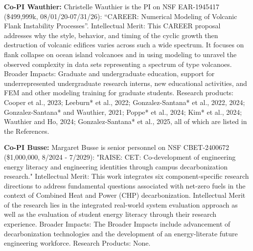 \documentclass[11pt]{article}
\begin{document}
\noindent\textbf{Co-PI Wauthier:}
Christelle Wauthier is the PI on NSF EAR-1945417 (\$499,999k, 08/01/20-07/31/26): “CAREER: Numerical Modeling of Volcanic Flank Instability Processes”. Intellectual Merit: This CAREER proposal addresses why the style, behavior, and timing of the cyclic growth then destruction of volcanic edifices varies across such a wide spectrum. It focuses on flank collapse on ocean island volcanoes and in using modeling to unravel the observed complexity in data sets representing a spectrum of type volcanoes. Broader Impacts: Graduate and undergraduate education, support for underrepresented undergraduate research interns, new educational activities, and FEM and other modeling training for graduate students. Research products: Cooper et al., 2023; Leeburn* et al., 2022; Gonzalez-Santana* et al., 2022, 2024; Gonzalez-Santana* and Wauthier, 2021; Poppe* et al., 2024; Kim* et al., 2024; Wauthier and Ho, 2024; Gonzalez-Santana* et al., 2025, all of which are listed in the References.


\noindent\textbf{Co-PI Busse:}
Margaret Busse is senior personnel on NSF CBET-2400672 (\$1,000,000, 8/2024 - 7/2029):
"RAISE: CET: Co-development of engineering energy literacy and engineering identities through campus decarbonization research."
Intellectual Merit:
This work integrates six component-specific research directions to address fundamental questions associated with net-zero fuels in the context of Combined Heat and Power (CHP) decarbonization.
Intellectual Merit of the research lies in the integrated real-world system evaluation approach as well as the evaluation of student energy literacy through their research experience. 
Broader Impacts:
The Broader Impacts include advancement of decarbonization technologies and the development of an energy-literate future engineering workforce.  
Research Products: None.

\newpage

\end{document}
